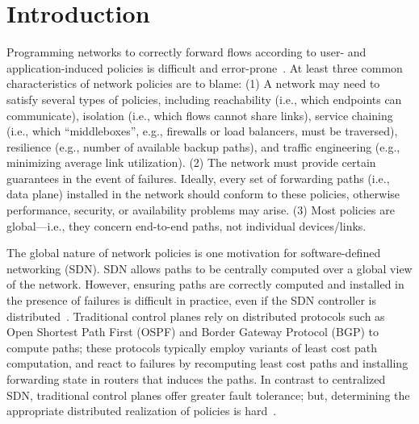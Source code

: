 \section{Introduction}
Programming networks to correctly forward flows according to user- and
application-induced policies is difficult and
error-prone~\cite{troubleshooting, bgpmisconfig}. 
At least three
common characteristics of network policies are to blame: (1) A network
may need to satisfy several types of policies, including reachability
(i.e., which endpoints can communicate), isolation (i.e., which flows
cannot share links), service chaining (i.e., which ``middleboxes'',
e.g., firewalls or load balancers, must be traversed), resilience
(e.g., number of available backup paths), and traffic engineering
(e.g., minimizing average link utilization). (2) The network must
provide certain guarantees in the event of failures. Ideally, every
set of forwarding paths (i.e., data plane) installed in the network
should conform to these policies, otherwise performance, security, or
availability problems may arise. (3) Most policies are global---i.e.,
they concern end-to-end paths, not individual devices/links.

The global nature of network policies is one motivation for
software-defined networking (SDN). SDN allows paths to be centrally
computed over a global view of the network. However, ensuring paths
are correctly computed and installed in the presence of failures is
difficult in practice, even if the SDN controller is
distributed~\cite{hasdn}.  Traditional control planes rely on
distributed protocols such as Open Shortest Path First (OSPF) and
Border Gateway Protocol (BGP) to compute paths; these protocols
typically employ variants of least cost path computation, and react to
failures by recomputing least cost paths and installing forwarding
state in routers that induces the paths. In contrast to centralized
SDN, traditional control planes offer greater fault tolerance; but,
determining the appropriate distributed realization of policies is
hard~\cite{propane}.

